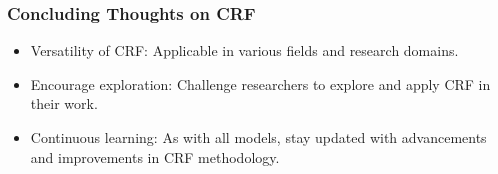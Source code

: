\documentclass{beamer}
\begin{document}
\begin{frame}
\frametitle{Concluding Thoughts on CRF}
\begin{itemize}
    \item Versatility of CRF: Applicable in various fields and research domains.
    \item Encourage exploration: Challenge researchers to explore and apply CRF in their work.
    \item Continuous learning: As with all models, stay updated with advancements and improvements in CRF methodology.
\end{itemize}
\end{frame}
\end{document}
